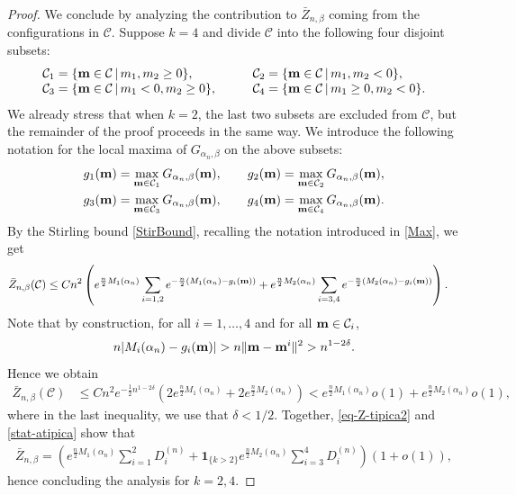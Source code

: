\documentclass[10pt,a4paper]{amsart}
\def \bm {{\bf m}}
\begin{document}
\begin{proof}
We conclude by analyzing the contribution to $\bar{Z}_{n,\beta}$ coming from the configurations in $\mathcal{C}$. Suppose $k=4$ and divide $\mathcal{C}$ into the following four disjoint subsets:
\begin{equation}\label{4subset}
\begin{array}{ll}
\mathcal{C}_1= \{ \bm \in \mathcal{C} \, | \, m_1,m_2\ge 0\},\qquad& \mathcal{C}_2= \{ \bm \in \mathcal{C} \, | \, m_1,m_2<0\},\\ 
 \mathcal{C}_3= \{ \bm \in \mathcal{C} \, | \, m_1<0,m_2\ge 0\},\qquad& \mathcal{C}_4= \{ \bm \in \mathcal{C} \, | \, m_1\ge 0,m_2<0\}.
\end{array}
\end{equation}
We already stress that when $k=2$, the last two subsets are excluded from $\mathcal{C}$, but the remainder of the proof proceeds in the same way. We introduce the following notation for the local maxima of $G_{\alpha_n,\beta}$ on the above subsets:
\begin{equation*}
\begin{split}
    & g_1(\bm)=\max_{\bm \in \mathcal{C}_1} G_{\alpha_n,\beta}(\bm), 
    \qquad  g_2(\bm)=\max_{\bm \in \mathcal{C}_2}G_{\alpha_n,\beta}(\bm), \\
    & g_3(\bm)=\max_{\bm \in \mathcal{C}_3}G_{\alpha_n,\beta}(\bm), 
    \qquad g_4(\bm)=\max_{\bm \in \mathcal{C}_4}G_{\alpha_n,\beta}(\bm).
\end{split}
\end{equation*}
By the Stirling bound \eqref{StirBound}, recalling the notation introduced in \eqref{Max}, we get
\begin{align*}
    \bar{Z}_{n,\beta}(\mathcal{C}) 
    & \leq C n^2 \left (e^{\frac{n}{2}M_1(\alpha_n)} \sum_{i=1,2} e^{-\frac{n}{2}(M_1(\alpha_n)-g_i(\bm))}
    +e^{\frac{n}{2}M_2(\alpha_n)}\sum_{i=3,4}e^{-\frac{n}{2}(M_2(\alpha_n)-g_i(\bm))}
        \right ).
\end{align*}
Note that by construction, for all $i=1,\ldots, 4$ and for all $\bm \in \mathcal{C}_i$,
\begin{equation*}
n|M_i(\alpha_n)-g_i(\bm)|>n\|\bm-\bm^i\|^2>n^{1-2\delta}.
\end{equation*}
Hence we obtain 
\begin{align}\label{stat-atipica}
\bar{Z}_{n,\beta}(\mathcal{C})& \leq Cn^2e^{-\frac{1}{2}n^{1-2\delta}} (2e^{\frac{n}{2}M_1(\alpha_n)}+2e^{\frac{n}{2}M_2(\alpha_n)})<e^{\frac{n}{2}M_1(\alpha_n)} o(1)+e^{\frac{n}{2}M_2(\alpha_n)} o(1),
\end{align}
where in the last inequality, we use that $\delta<1/2$.
Together, \eqref{eq-Z-tipica2} and \eqref{stat-atipica} show that
\begin{align*}
        \bar{Z}_{n,\beta}=\left (e^{\frac{n}{2} M_1(\alpha_n)} \sum_{i=1}^2 D_i^{(n)}+\textbf{1}_{\{k>2\}}e^{\frac{n}{2}M_2(\alpha_n)} \sum_{i=3}^4 D_i^{(n)} \right ) (1+o(1)),
    \end{align*}
hence concluding the analysis for $k=2,4$.



\end{proof}
\end{document}
